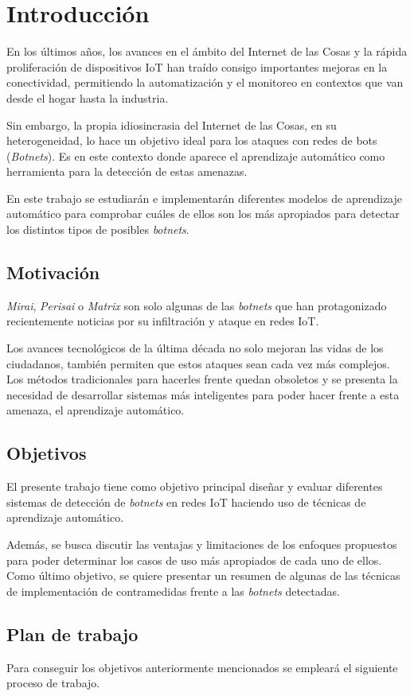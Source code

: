 \chapter{Introducción}
\label{cap:introduccion}



En los últimos años, los avances en el ámbito del Internet de las Cosas y la rápida proliferación de dispositivos IoT han traído consigo importantes mejoras en la conectividad, permitiendo la automatización y el monitoreo en contextos que van desde el hogar hasta la industria.

Sin embargo, la propia idiosincrasia del Internet de las Cosas, en su heterogeneidad, lo hace un objetivo ideal para los ataques con redes de bots (\textit{Botnets}). Es en este contexto donde aparece el aprendizaje automático como herramienta para la detección de estas amenazas.

En este trabajo se estudiarán e implementarán diferentes modelos de aprendizaje automático para comprobar cuáles de ellos son los más apropiados para detectar los distintos tipos de posibles \textit{botnets}.

\section{Motivación}


\textit{Mirai}, \textit{Perisai} o \textit{Matrix} son solo algunas de las \textit{botnets} que han protagonizado recientemente noticias por su infiltración y ataque en redes IoT. 

Los avances tecnológicos de la última década no solo mejoran las vidas de los ciudadanos, también permiten que estos ataques sean cada vez más complejos. Los métodos tradicionales para hacerles frente quedan obsoletos y se presenta la necesidad de desarrollar sistemas más inteligentes para poder hacer frente a esta amenaza, el aprendizaje automático.

\section{Objetivos}
El presente trabajo tiene como objetivo principal diseñar y evaluar diferentes sistemas de detección de \textit{botnets} en redes IoT haciendo uso de técnicas de aprendizaje automático.

Además, se busca discutir las ventajas y limitaciones de los enfoques propuestos para poder determinar los casos de uso más apropiados de cada uno de ellos. Como último objetivo, se quiere presentar un resumen de algunas de las técnicas de implementación de contramedidas frente a las \textit{botnets} detectadas.

\section{Plan de trabajo}
Para conseguir los objetivos anteriormente mencionados se empleará el siguiente proceso de trabajo.

